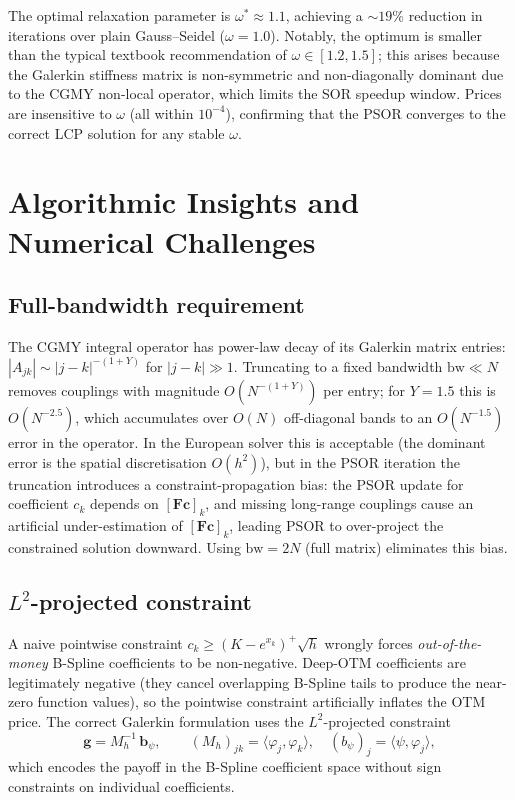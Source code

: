 \documentclass[11pt,a4paper]{article}
\begin{document}
The optimal relaxation parameter is $\omega^*\approx 1.1$, achieving a
$\sim19\%$ reduction in iterations over plain Gauss--Seidel ($\omega=1.0$).
Notably, the optimum is smaller than the typical textbook recommendation of
$\omega\in[1.2, 1.5]$; this arises because the Galerkin stiffness matrix is
non-symmetric and non-diagonally dominant due to the CGMY non-local operator,
which limits the SOR speedup window.  Prices are insensitive to $\omega$
(all within $10^{-4}$), confirming that the PSOR converges to the correct LCP
solution for any stable $\omega$.

\section{Algorithmic Insights and Numerical Challenges}

\subsection{Full-bandwidth requirement}

The CGMY integral operator has power-law decay of its Galerkin matrix entries:
$|A_{jk}|\sim |j-k|^{-(1+Y)}$ for $|j-k|\gg 1$.  Truncating to a fixed
bandwidth $\mathrm{bw}\ll N$ removes couplings with magnitude $O(N^{-(1+Y)})$
per entry; for $Y=1.5$ this is $O(N^{-2.5})$, which accumulates over $O(N)$
off-diagonal bands to an $O(N^{-1.5})$ error in the operator.  In the European
solver this is acceptable (the dominant error is the spatial discretisation
$O(h^2)$), but in the PSOR iteration the truncation introduces a
constraint-propagation bias: the PSOR update for coefficient $c_k$ depends on
$[\mathbf{Fc}]_k$, and missing long-range couplings cause an artificial
under-estimation of $[\mathbf{Fc}]_k$, leading PSOR to over-project the
constrained solution downward.  Using $\mathrm{bw}=2N$ (full matrix)
eliminates this bias.

\subsection{$L^2$-projected constraint}

A naive pointwise constraint $c_k \ge (K - e^{x_k})^+\sqrt{h}$ wrongly
forces \emph{out-of-the-money} B-Spline coefficients to be non-negative.
Deep-OTM coefficients are legitimately negative (they cancel overlapping
B-Spline tails to produce the near-zero function values), so the pointwise
constraint artificially inflates the OTM price. The correct Galerkin
formulation uses the $L^2$-projected constraint
\begin{equation}
  \mathbf{g} = M_h^{-1}\,\mathbf{b}_\psi,
  \qquad (M_h)_{jk} = \langle\varphi_j,\varphi_k\rangle,
  \quad (b_\psi)_j = \langle\psi,\varphi_j\rangle,
\end{equation}
which encodes the payoff in the B-Spline coefficient space without sign
constraints on individual coefficients.
\end{document}
